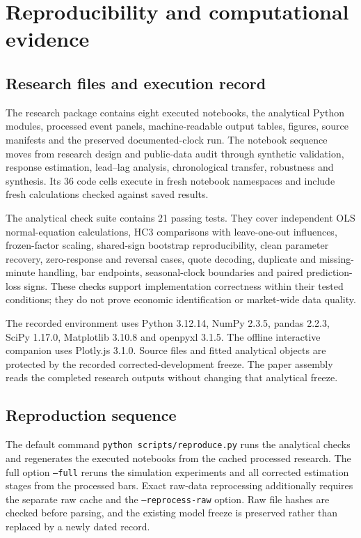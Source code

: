 \section{Reproducibility and computational evidence}\label{app:reproduction}
\subsection{Research files and execution record}
The research package contains eight executed notebooks, the analytical Python modules, processed event panels, machine-readable output tables, figures, source manifests and the preserved documented-clock run. The notebook sequence moves from research design and public-data audit through synthetic validation, response estimation, lead--lag analysis, chronological transfer, robustness and synthesis. Its 36 code cells execute in fresh notebook namespaces and include fresh calculations checked against saved results.

The analytical check suite contains 21 passing tests. They cover independent OLS normal-equation calculations, HC3 comparisons with leave-one-out influences, frozen-factor scaling, shared-sign bootstrap reproducibility, clean parameter recovery, zero-response and reversal cases, quote decoding, duplicate and missing-minute handling, bar endpoints, seasonal-clock boundaries and paired prediction-loss signs. These checks support implementation correctness within their tested conditions; they do not prove economic identification or market-wide data quality.

The recorded environment uses Python 3.12.14, NumPy 2.3.5, pandas 2.2.3, SciPy 1.17.0, Matplotlib 3.10.8 and openpyxl 3.1.5. The offline interactive companion uses Plotly.js 3.1.0. Source files and fitted analytical objects are protected by the recorded corrected-development freeze. The paper assembly reads the completed research outputs without changing that analytical freeze.

\subsection{Reproduction sequence}
The default command \texttt{python scripts/reproduce.py} runs the analytical checks and regenerates the executed notebooks from the cached processed research. The full option \texttt{--full} reruns the simulation experiments and all corrected estimation stages from the processed bars. Exact raw-data reprocessing additionally requires the separate raw cache and the \texttt{--reprocess-raw} option. Raw file hashes are checked before parsing, and the existing model freeze is preserved rather than replaced by a newly dated record.

